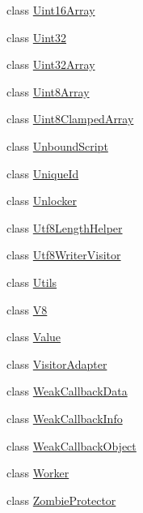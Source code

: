 \begin{DoxyCompactItemize}
\item 
class \hyperlink{classv8_1_1_uint16_array}{Uint16\+Array}
\item 
class \hyperlink{classv8_1_1_uint32}{Uint32}
\item 
class \hyperlink{classv8_1_1_uint32_array}{Uint32\+Array}
\item 
class \hyperlink{classv8_1_1_uint8_array}{Uint8\+Array}
\item 
class \hyperlink{classv8_1_1_uint8_clamped_array}{Uint8\+Clamped\+Array}
\item 
class \hyperlink{classv8_1_1_unbound_script}{Unbound\+Script}
\item 
class \hyperlink{classv8_1_1_unique_id}{Unique\+Id}
\item 
class \hyperlink{classv8_1_1_unlocker}{Unlocker}
\item 
class \hyperlink{classv8_1_1_utf8_length_helper}{Utf8\+Length\+Helper}
\item 
class \hyperlink{classv8_1_1_utf8_writer_visitor}{Utf8\+Writer\+Visitor}
\item 
class \hyperlink{classv8_1_1_utils}{Utils}
\item 
class \hyperlink{classv8_1_1_v8}{V8}
\item 
class \hyperlink{classv8_1_1_value}{Value}
\item 
class \hyperlink{classv8_1_1_visitor_adapter}{Visitor\+Adapter}
\item 
class \hyperlink{classv8_1_1_weak_callback_data}{Weak\+Callback\+Data}
\item 
class \hyperlink{classv8_1_1_weak_callback_info}{Weak\+Callback\+Info}
\item 
class \hyperlink{classv8_1_1_weak_callback_object}{Weak\+Callback\+Object}
\item 
class \hyperlink{classv8_1_1_worker}{Worker}
\item 
class \hyperlink{classv8_1_1_zombie_protector}{Zombie\+Protector}
\end{DoxyCompactItemize}
